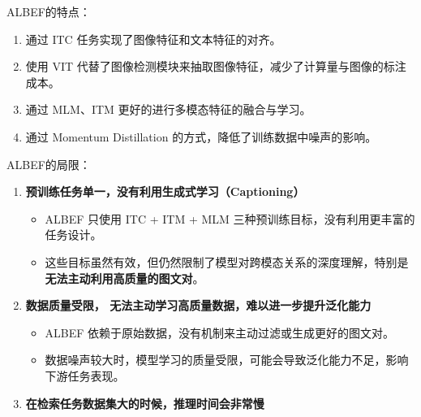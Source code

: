 \documentclass[zihao=false,fontset=windows]{ctexart}
\begin{document}
\vspace{0.45em}
\par\vspace{1.15em}\par\vspace{0.28em}
ALBEF的特点：\par
\begin{enumerate}
\item 通过 ITC 任务实现了图像特征和文本特征的对齐。
\item 使用 VIT 代替了图像检测模块来抽取图像特征，减少了计算量与图像的标注成本。
\item 通过 MLM、ITM 更好的进行多模态特征的融合与学习。
\item 通过 Momentum Distillation 的方式，降低了训练数据中噪声的影响。
\end{enumerate}
ALBEF的局限：\par
\begin{enumerate}
\item \textbf{预训练任务单一，没有利用生成式学习（Captioning）}
\begin{itemize}
\item ALBEF 只使用 ITC + ITM + MLM 三种预训练目标，没有利用更丰富的任务设计。
\item 这些目标虽然有效，但仍然限制了模型对跨模态关系的深度理解，特别是\textbf{无法主动利用高质量的图文对}。
\end{itemize}
\item \textbf{数据质量受限， 无法主动学习高质量数据，难以进一步提升泛化能力}
\begin{itemize}
\item ALBEF 依赖于原始数据，没有机制来主动过滤或生成更好的图文对。
\item 数据噪声较大时，模型学习的质量受限，可能会导致泛化能力不足，影响下游任务表现。
\end{itemize}
\item \textbf{在检索任务数据集大的时候，推理时间会非常慢}
\end{enumerate}
\end{document}
